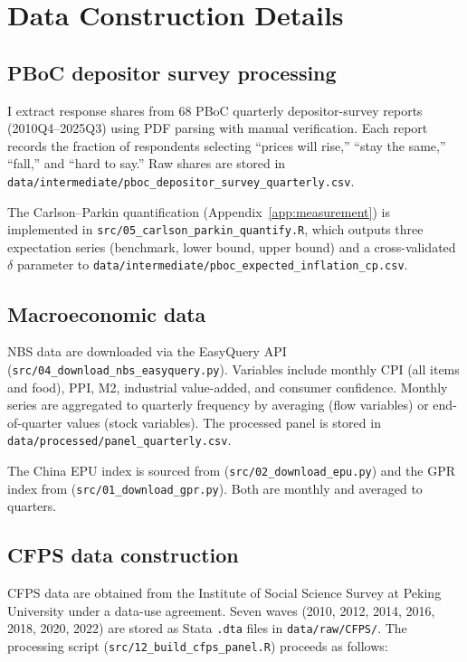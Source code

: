 \section{Data Construction Details}\label{app:data}

\subsection{PBoC depositor survey processing}

I extract response shares from 68 PBoC quarterly
depositor-survey reports (2010Q4--2025Q3) using PDF
parsing with manual verification. Each report records
the fraction of respondents selecting ``prices will
rise,'' ``stay the same,'' ``fall,'' and ``hard to
say.'' Raw shares are stored in
\texttt{data/intermediate/pboc\_depositor\_survey\_quarterly.csv}.

The Carlson--Parkin quantification
(Appendix~\ref{app:measurement}) is implemented in
\texttt{src/05\_carlson\_parkin\_quantify.R}, which
outputs three expectation series (benchmark, lower
bound, upper bound) and a cross-validated $\delta$
parameter to
\texttt{data/intermediate/pboc\_expected\_inflation\_cp.csv}.

\subsection{Macroeconomic data}

NBS data are downloaded via the EasyQuery API
(\texttt{src/04\_download\_nbs\_easyquery.py}).
Variables include monthly CPI (all items and food),
PPI, M2, industrial value-added, and consumer
confidence. Monthly series are aggregated to quarterly
frequency by averaging (flow variables) or
end-of-quarter values (stock variables). The processed
panel is stored in
\texttt{data/processed/panel\_quarterly.csv}.

The China EPU index is sourced from
\citet{Baker2016} (\texttt{src/02\_download\_epu.py})
and the GPR index from \citet{Caldara2022}
(\texttt{src/01\_download\_gpr.py}). Both are monthly
and averaged to quarters.

\subsection{CFPS data construction}

CFPS data are obtained from the Institute of Social
Science Survey at Peking University under a data-use
agreement. Seven waves (2010, 2012, 2014, 2016, 2018,
2020, 2022) are stored as Stata \texttt{.dta} files in
\texttt{data/raw/CFPS/}. The processing script
(\texttt{src/12\_build\_cfps\_panel.R}) proceeds as
follows:

